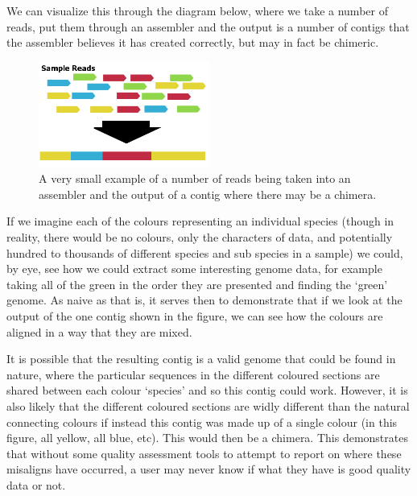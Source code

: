 We can visualize this through  the diagram below, where we take a number of reads, put them through an assembler and the output is a number of contigs that the assembler believes it has created correctly, but may in fact be chimeric.

\begin{figure}[H]
	\centering
\includegraphics[width=0.5\textwidth]{images/basicmetaassembly}
	\caption{A very small example of a number of reads being taken into an assembler and the output of a contig where there may be a chimera.}
\end{figure}

If we imagine each of the colours representing an individual species (though in reality, there would be no colours, only the characters of data, and potentially hundred to thousands of different species and sub species in a sample) we could, by eye, see how we could extract some interesting genome data, for example taking all of the green in the order they are presented and finding the `green' genome. As naive as that is, it serves then to demonstrate that if we look at the output of the one contig shown in the figure, we can see how the  colours are aligned in a way that they are mixed.

It is possible that the resulting contig is a valid genome that could be found in nature, where the particular sequences in the different coloured sections are shared between each colour `species' and so this contig could work. However, it is also likely that the different coloured sections are widly different than the natural connecting colours if instead this contig was made up of a single colour (in this figure, all yellow, all blue, etc). This would then be a chimera. This demonstrates that without some quality assessment tools to attempt to report on where these misaligns have occurred, a user may never know if what they have is good quality data or not.

